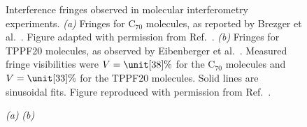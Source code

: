 \documentclass[3p,sort&compress,12pt]{elsarticle}
\begin{document}
\begin{figure}
\caption{Interference fringes observed in molecular interferometry experiments. \emph{(a)} Fringes for C$_{70}$ molecules, as reported by Brezger et al.\ \cite{Brezger:2002:mu}.  Figure adapted with permission from Ref.~\cite{Brezger:2002:mu}. \emph{(b)} Fringes for TPPF20 molecules, as observed by Eibenberger et al.\ \cite{Eibenberger:2013:az}. Measured fringe visibilities were $V=\unit[38]{\%}$ for the C$_{70}$ molecules and $V=\unit[33]{\%}$ for the TPPF20 molecules.  Solid lines are sinusoidal fits. Figure reproduced with permission from Ref.~\cite{Eibenberger:2013:az}.}
\label{fig:pattern}
\end{figure}

\begin{figure}
{\footnotesize  \hspace{.7cm} \emph{(a)} \hspace{7.3cm} \emph{(b)} }

\vspace{.2cm}


\end{figure}
\end{document}
